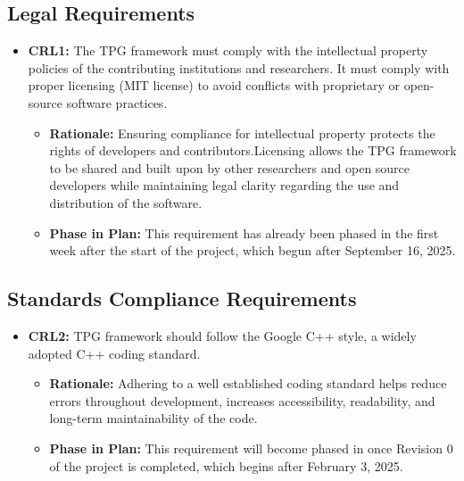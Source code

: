 \documentclass[12pt]{article}
\begin{document}
\subsection{Legal Requirements}
\begin{itemize}
  \item \label{CRL1} \textbf{CRL1:}  The TPG framework must comply with the intellectual property policies of the contributing institutions and researchers. It must comply with proper licensing (MIT license) to avoid conflicts with proprietary or open-source software practices.

      \begin{itemize}
        \item \textbf{Rationale:} Ensuring compliance for intellectual property protects the rights of developers and contributors.Licensing allows the TPG framework to be shared and built upon by other researchers and open source developers while maintaining legal clarity regarding the use and distribution of the software.
        \item \textbf{Phase in Plan:} This requirement has already been phased in the first week after the start of the project, which begun after September 16, 2025. 
      \end{itemize}
\end{itemize}

\subsection{Standards Compliance Requirements}
\begin{itemize}
  \item \label{CRL2} \textbf{CRL2:}  TPG framework should follow the Google C++ style, a widely adopted C++ coding standard.

      \begin{itemize}
        \item \textbf{Rationale:} Adhering to a well established coding standard helps reduce errors throughout development, increases accessibility, readability, and long-term maintainability of the code.
        \item \textbf{Phase in Plan:} This requirement will become phased in once Revision 0 of the project is completed, which begins after February 3, 2025. 
      \end{itemize}
\end{itemize}
\end{document}
